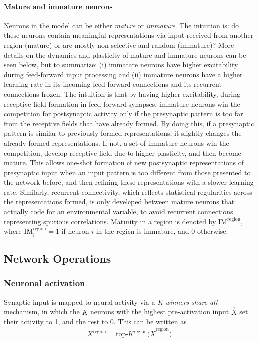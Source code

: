 \documentclass{article}
\begin{document}
\paragraph{Mature and immature neurons} Neurons in the model can be either \textit{mature} or \textit{immature}. The intuition is: do these neurons contain meaningful representations via input received from another region (mature) or are mostly non-selective and random (immature)? More details on the dynamics and plasticity of mature and immature neurons can be seen below, but to summarize: (i) immature neurons have higher excitability during feed-forward input processing and (ii) immature neurons have a higher learning rate in its incoming feed-forward connections and its recurrent connections frozen. The intuition is that by having higher excitability, during receptive field formation in feed-forward synapses, immature neurons win the competition for postsynaptic activity only if the presynaptic pattern is too far from the receptive fields that have already formed. By doing this, if a presynaptic pattern is similar to previously formed representations, it slightly changes the already formed representations. If not, a set of immature neurons win the competition, develop receptive field due to higher plasticity, and then become mature. This allows one-shot formation of new postsynaptic representations of presynaptic input when an input pattern is too different from those presented to the network before, and then refining these representations with a slower learning rate. Similarly, recurrent connectivity, which reflects statistical regularities across the representations formed, is only developed between mature neurons that actually code for an environmental variable, to avoid recurrent connections representing spurious correlations. Maturity in a region is denoted by $\textrm{IM}^\textrm{region}$, where $\textrm{IM}^\textrm{region}_i = 1$ if neuron $i$ in the region is immature, and 0 otherwise.
\subsection*{Network Operations}
\subsubsection*{Neuronal activation}
Synaptic input is mapped to neural activity via a \textit{K-winners-share-all} mechanism, in which the $K$ neurons with the highest pre-activation input $\hat{X}$ set their activity to 1, and the rest to 0. This can be written as
\begin{equation}
    X^\textrm{region} = \textrm{top-}K^\textrm{region}\big(\hat{X}^\textrm{region}\big)
\end{equation}
\end{document}
